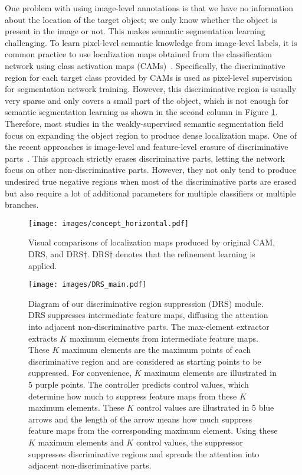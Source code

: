 \documentclass[letterpaper]{article} \usepackage{aaai21}  \usepackage{times}  \usepackage{helvet} \usepackage{courier}  \usepackage[hyphens]{url}  \usepackage{graphicx} \urlstyle{rm} \def\UrlFont{\rm}  \usepackage{natbib}  \usepackage{caption} \frenchspacing  \setlength{\pdfpagewidth}{8.5in}  \setlength{\pdfpageheight}{11in}
\begin{document}
One problem with using image-level annotations is that we have no information about the location of the target object; we only know whether the object is present in the image or not.
This makes semantic segmentation learning challenging.
To learn pixel-level semantic knowledge from image-level labels, it is common practice to use localization maps obtained from the classification network using class activation maps (CAMs)~\cite{zhou2016learning}. 
Specifically, the discriminative region for each target class provided by CAMs is used as pixel-level supervision for segmentation network training.
However, this discriminative region is usually very sparse and only covers a small part of the object, which is not enough for semantic segmentation learning as shown in the second column in Figure \ref{figure:concept}. 
Therefore, most studies in the weakly-supervised semantic segmentation field focus on expanding the object region to produce dense localization maps.
One of the recent approaches is image-level and feature-level erasure of discriminative parts~\cite{wei2017object, li2018tell, hou2018self}.
This approach strictly erases discriminative parts, letting the network focus on other non-discriminative parts.
However, they not only tend to produce undesired true negative regions when most of the discriminative parts are erased but also require a lot of additional parameters for multiple classifiers or multiple branches.


\begin{figure}[t]
    \centering

    \texttt{[image: images/concept\_horizontal.pdf]}
    \caption{Visual comparisons of localization maps produced by original CAM, DRS, and DRS$\dagger$. DRS$\dagger$ denotes that the refinement learning is applied.}
    \label{figure:concept}
\end{figure}



\begin{figure*}[t]
    \centering
    \texttt{[image: images/DRS\_main.pdf]}
    \caption{
        Diagram of our discriminative region suppression (DRS) module. DRS suppresses intermediate feature maps, diffusing the attention into adjacent non-discriminative parts.
        The max-element extractor extracts $K$ maximum elements from intermediate feature maps. 
        These $K$ maximum elements are the maximum points of each discriminative region and are considered as starting points to be suppressed.
        For convenience, $K$ maximum elements are illustrated in 5 purple points.
        The controller predicts control values, which determine how much to suppress feature maps from these $K$ maximum elements.
        These $K$ control values are illustrated in 5 blue arrows and the length of the arrow means how much suppress feature maps from the corresponding maximum element.
        Using these $K$ maximum elements and $K$ control values, the suppressor suppresses discriminative regions and spreads the attention into adjacent non-discriminative parts.
    }
    \label{figure:main}
\end{figure*}
\end{document}
